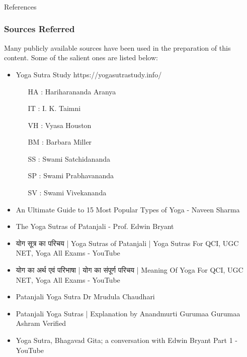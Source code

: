 \begin{frame}[fragile]\frametitle{}
\begin{center}
{\Large References}
\end{center}
\end{frame}


\begin{frame}[fragile]\frametitle{Sources Referred}

Many publicly available sources have been used in the preparation of this content. Some of the salient ones are listed below:

	\begin{itemize}
	\item Yoga Sutra Study https://yogasutrastudy.info/
		\begin{itemize}
		\item [HA]: Hariharananda Aranya
		\item [IT]: I. K. Taimni
		\item [VH]: Vyasa Houston
		\item [BM]: Barbara Miller
		\item [SS]: Swami Satchidananda
		\item [SP]: Swami Prabhavananda
		\item [SV]: Swami Vivekananda
		\end{itemize}	
	\item An Ultimate Guide to 15 Most Popular Types of Yoga - Naveen Sharma
	\item The Yoga Sutras of Patanjali - Prof. Edwin Bryant
	\item योग सूत्र का परिचय | Yoga Sutras of Patanjali | Yoga Sutras For QCI, UGC NET, Yoga All Exams - YouTube
	\item योग का अर्थ एवं परिभाषा | योग का संपूर्ण परिचय | Meaning Of Yoga For QCI, UGC NET, Yoga All Exams - YouTube
	\item Patanjali Yoga Sutra Dr Mrudula Chaudhari
	\item Patanjali Yoga Sutras | Explanation by Anandmurti Gurumaa Gurumaa Ashram Verified
	\item Yoga Sutra, Bhagavad Gita; a conversation with Edwin Bryant Part 1 - YouTube
	\end{itemize}

\end{frame}

